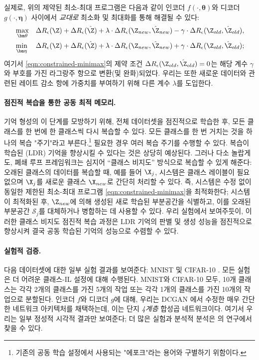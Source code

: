 \documentclass[../../book-main_ko.tex]{subfiles}
\begin{document}
실제로, 위의 제약된 최소-최대 프로그램은 다음과 같이 인코더 $f(\cdot, \bm \theta)$와 디코더 $g(\cdot, \bm \eta)$ 사이에서 {\em 교대로} 최소화 및 최대화를 통해 해결될 수 있다:
\begin{eqnarray}
      &\max_{\bm \theta}  &\Delta{R_\epsilon(\Z)}+\Delta{R_\epsilon(\hat{\Z})}+\lambda\cdot  \Delta{R_\epsilon(\Z_{new},\hat{\Z}_{new})} - \gamma\cdot \Delta{R_\epsilon(\Z_{old},\hat{\Z}_{old})}, \label{eqn:relaxed-max} \\
      &\min_{\bm \eta} &\Delta{R_\epsilon(\Z)}+\Delta{R_\epsilon(\hat{\Z})}+\lambda\cdot \Delta{R_\epsilon(\Z_{new},\hat{\Z}_{new})} + \gamma\cdot \Delta{R_\epsilon(\Z_{old},\hat{\Z}_{old})}; \label{eqn:relaxed-min}
\end{eqnarray}
여기서 \eqref{eqn:constrained-minimax}의 제약 조건 $\Delta R_\epsilon(\Z_{old},\hat{\Z}_{old}) = 0$는 해당 계수 $\gamma$와 부호를 가진 라그랑주 항으로 변환(및 완화)되었다. 우리는 또한 새로운 데이터와 관련된 레이트 감소 항에 가중치를 부여하기 위해 다른 계수 $\lambda$를 도입한다.

\paragraph{점진적 복습을 통한 공동 최적 메모리.}
기억 형성의 이 단계를 모방하기 위해, 전체 데이터셋을 점진적으로 학습한 후, 모든 클래스를 한 번에 한 클래스씩 다시 복습할 수 있다. 모든 클래스를 한 번 거치는 것을 하나의 복습 "주기"라고 부른다.\footnote{기존의 공동 학습 설정에서 사용되는 "에포크"라는 용어와 구별하기 위함이다.} 필요한 경우 여러 복습 주기를 수행할 수 있다. 복습이 학습된 (LDR) 기억을 향상시킬 수 있다는 것은 상당히 예상된다. 그러나 다소 놀랍게도, 폐쇄 루프 프레임워크는 심지어 ``{클래스 비지도}'' 방식으로 복습할 수 있게 해준다: 오래된 클래스의 데이터를 복습할 때, 예를 들어 $\X_j$, 시스템은 클래스 레이블이 필요 없으며 $\X_j$를 새로운 클래스 $\X_{new}$로 간단히 처리할 수 있다. 즉, 시스템은 수정 없이 동일한 제한된 최소-최대 프로그램 \eqref{eqn:constrained-minimax}을 최적화한다; 시스템이 최적화된 후, $\Z_{new}$에 의해 생성된 새로 학습된 부분공간을 식별하고, 이를 오래된 부분공간 $\mathcal{S}_j$를 대체하거나 병합하는 데 사용할 수 있다. 우리 실험에서 보여주듯이, 이러한 클래스 비지도 점진적 복습 과정은 LDR 기억의 판별 및 생성 성능을 점진적으로 향상시켜 결국 공동 학습된 기억의 성능으로 수렴할 수 있다.

\paragraph{실험적 검증.}
다음 데이터셋에 대한 일부 실험 결과를 보여준다: MNIST \cite{lecun1998gradient} 및 CIFAR-10 \cite{krizhevsky2014cifar}. 모든 실험은 더 어려운 클래스-IL 설정에 대해 수행된다. MNIST와 CIFAR-10 모두, 10개 클래스는 각각 2개의 클래스를 가진 5개의 작업 또는 각각 1개의 클래스를 가진 10개의 작업으로 분할된다. 인코더 $f$와 디코더 $g$에 대해, 우리는 DCGAN \cite{radford2016unsupervised}에서 수정한 매우 간단한 네트워크 아키텍처를 채택하는데, 이는 단지 {\em 4계층} 합성곱 네트워크이다. 여기서 우리는 일부 정성적 시각적 결과만 보여준다; 더 많은 실험과 분석적 분석은 \cite{tong2023incremental}의 연구에서 찾을 수 있다.
\end{document}
